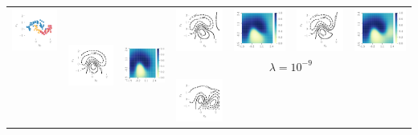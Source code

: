 \documentclass{article}
\theoremstyle{definition}
\begin{document}
\begin{table}
\begin{tabular}{@{}c@{}c@{}c@{}c@{}c@{}c@{}c@{}}
{    \includegraphics[trim={0mm 0mm 3mm 3mm}, clip,height=0.13\textwidth]{img/moon/moon_rm_30_data.pdf}
}
&
\multirow[t]{4}{*}{
    \includegraphics[trim={7mm 8mm 3mm 3mm}, clip,height=0.13\textwidth]{img/moon/moon_rm_30_remain_meanf.pdf}
}
&
\multirow[t]{4}{*}{
    \includegraphics[height=0.13\textwidth]{img/moon/moon_rm_30_remain_prob.pdf}
}
&
\includegraphics[trim={7mm 8mm 3mm 3mm}, clip,height=0.13\textwidth]{img/moon/moon_rm_30_eubo_meanf_1e-09.pdf}
&
\includegraphics[height=0.13\textwidth]{img/moon/moon_rm_30_eubo_prob_1e-09.pdf}
&
\includegraphics[trim={7mm 8mm 3mm 3mm}, clip,height=0.13\textwidth]{img/moon/moon_rm_30_elbo_meanf_1e-09.pdf}
&
\includegraphics[height=0.13\textwidth]{img/moon/moon_rm_30_elbo_prob_1e-09.pdf}
\\
& & &
\multicolumn{4}{c}{$\lambda = 10^{-9}$}
\\
& & &
\includegraphics[trim={7mm 8mm 3mm 3mm}, clip,height=0.13\textwidth]{img/moon/moon_rm_30_eubo_meanf_0_0.pdf}

\end{tabular}
\end{table}
\end{document}
